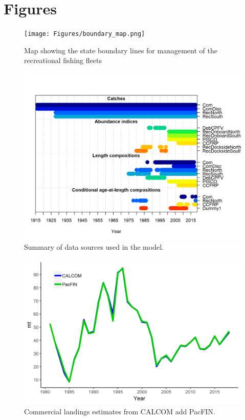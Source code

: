\documentclass[12pt,]{article}
\begin{document}
\newpage

\section{Figures}\label{figures-1}

\begin{figure}
\centering
\texttt{[image: Figures/boundary\_map.png]}
\caption{Map showing the state boundary lines for management of the
recreational fishing fleets \label{fig:boundary_map}}
\end{figure}

\begin{figure}
\centering
\includegraphics{r4ss/plots_mod1/data_plot.png}
\caption{Summary of data sources used in the model.
\label{fig:data_plot}}
\end{figure}

\begin{figure}
\centering
\includegraphics{Figures/Calcom_vs_Pacfin.png}
\caption{Commercial landings estimates from CALCOM add PacFIN.
\label{fig:Calcom_vs_Pacfin}}
\end{figure}
\end{document}
